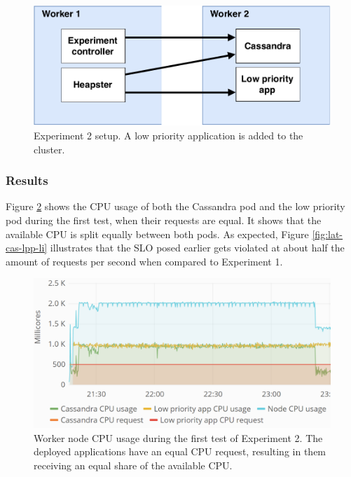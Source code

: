 \begin{figure}
\centering
\includegraphics[width=0.60\columnwidth]{Images/Experiments/Experiment_2.pdf}
\caption{Experiment 2 setup. A low priority application is added to the cluster.}
\label{fig:experiment2}
\end{figure}

\subsubsection{Results}
Figure \ref{fig:cpu-cas-lpp-li} shows the CPU usage of both the Cassandra pod and the low priority pod during the first test, when their requests are equal. It shows that the available CPU is split equally between both pods. As expected, Figure \ref{fig:lat-cas-lpp-li} illustrates that the SLO posed earlier gets violated at about half the amount of requests per second when compared to Experiment 1.

\begin{figure}
\centering
\includegraphics[width=0.90\columnwidth]{Images/Experiments/CPU/Grafana/cpu-cas-lpp-li.PNG}
\caption{Worker node CPU usage during the first test of Experiment 2. The deployed applications have an equal CPU request, resulting in them receiving an equal share of the available CPU.}
\label{fig:cpu-cas-lpp-li}
\end{figure}

